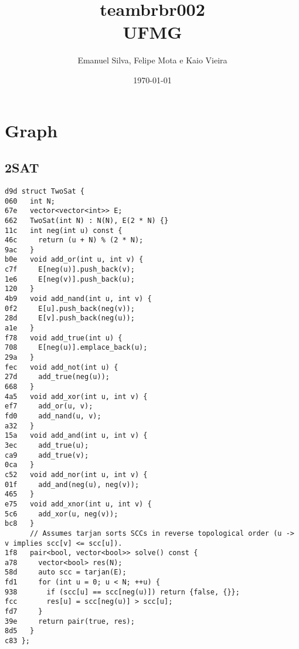 \documentclass[10pt, a4paper, twoside]{article}
\title{teambrbr002 \\ UFMG}
\author{Emanuel Silva, Felipe Mota e Kaio Vieira}
\begin{document}
\twocolumn
\date{\today}
\maketitle


\renewcommand{\contentsname}{Índice} %
\tableofcontents


%
%

\section{Graph}

\subsection{2SAT}
\begin{lstlisting}
d9d struct TwoSat {
060   int N;
67e   vector<vector<int>> E;
662   TwoSat(int N) : N(N), E(2 * N) {}
11c   int neg(int u) const {
46c     return (u + N) % (2 * N);
9ac   }
b0e   void add_or(int u, int v) {
c7f     E[neg(u)].push_back(v);
1e6     E[neg(v)].push_back(u);
120   }
4b9   void add_nand(int u, int v) {
0f2     E[u].push_back(neg(v));
28d     E[v].push_back(neg(u));
a1e   }
f78   void add_true(int u) {
708     E[neg(u)].emplace_back(u);
29a   }
fec   void add_not(int u) {
27d     add_true(neg(u));
668   }
4a5   void add_xor(int u, int v) {
ef7     add_or(u, v);
fd0     add_nand(u, v);
a32   }
15a   void add_and(int u, int v) {
3ec     add_true(u);
ca9     add_true(v);
0ca   }
c52   void add_nor(int u, int v) {
01f     add_and(neg(u), neg(v));
465   }
e75   void add_xnor(int u, int v) {
5c6     add_xor(u, neg(v));
bc8   }
      // Assumes tarjan sorts SCCs in reverse topological order (u -> v implies scc[v] <= scc[u]).
1f8   pair<bool, vector<bool>> solve() const {
a78     vector<bool> res(N);
58d     auto scc = tarjan(E);
fd1     for (int u = 0; u < N; ++u) {
938       if (scc[u] == scc[neg(u)]) return {false, {}};
fcc       res[u] = scc[neg(u)] > scc[u];
fd7     }
39e     return pair(true, res);
8d5   }
c83 };
\end{lstlisting}
\end{document}
